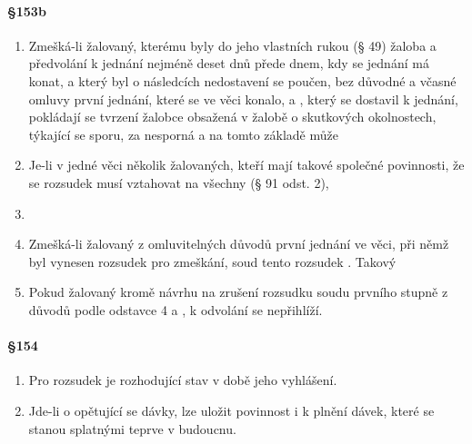 \paragraph{\S 153b}

\begin{enumerate}[label={(\arabic*)}]
  \item Zmešká-li žalovaný, kterému byly  do jeho vlastních rukou (§ 49) žaloba a předvolání k jednání nejméně deset dnů přede dnem, kdy se jednání má konat, a který byl o následcích nedostavení se poučen, bez důvodné a včasné omluvy první jednání, které se ve věci konalo, a , který se dostavil k jednání, pokládají se tvrzení žalobce obsažená v žalobě o skutkových okolnostech, týkající se sporu, za nesporná a na tomto základě může 
  \item Je-li v jedné věci několik žalovaných, kteří mají takové společné povinnosti, že se rozsudek musí vztahovat na všechny (§ 91 odst. 2), 
  \item {}
  \item Zmešká-li žalovaný z omluvitelných důvodů první jednání ve věci, při němž byl vynesen rozsudek pro zmeškání, soud  tento rozsudek . Takový 
  \item Pokud žalovaný kromě návrhu na zrušení rozsudku soudu prvního stupně z důvodů podle odstavce 4  a , k odvolání se nepřihlíží.
\end{enumerate}

\paragraph{\S 154}

\begin{enumerate}[label={(\arabic*)}]
  \item Pro rozsudek je rozhodující stav v době jeho vyhlášení.
  \item Jde-li o opětující se dávky, lze uložit povinnost i k plnění dávek, které se stanou splatnými teprve v budoucnu.
\end{enumerate}

